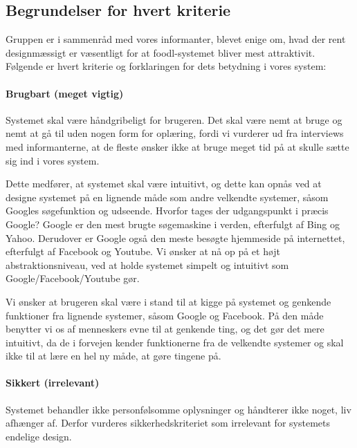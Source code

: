 \subsection{Begrundelser for hvert kriterie}
\label{sec:begrundelsekriterier}
Gruppen er i sammenråd med vores informanter, blevet enige om, hvad der rent designmæssigt er væsentligt for at foodl-systemet bliver mest attraktivit. Følgende er hvert kriterie og forklaringen for dets betydning i vores system:

\paragraph{Brugbart (meget vigtig)} 
Systemet skal være håndgribeligt for brugeren. Det skal være nemt at bruge og nemt at gå til uden nogen form for oplæring, fordi vi vurderer ud fra interviews med informanterne, at de fleste ønsker ikke at bruge meget tid på at skulle sætte sig ind i vores system. 

Dette medfører, at systemet skal være intuitivt, og dette kan opnås ved at designe systemet på en lignende måde som andre velkendte systemer, såsom Googles søgefunktion og udseende. Hvorfor tages der udgangspunkt i præcis Google? Google er den mest brugte søgemaskine i verden, efterfulgt af Bing og Yahoo.\cite{googlesoeg} \cite{ebizmba} Derudover er Google også den meste besøgte hjemmeside på internettet, efterfulgt af Facebook og Youtube. \cite{alexadk} Vi ønsker at nå op på et højt abstraktionsniveau, ved at holde systemet simpelt og intuitivt som Google/Facebook/Youtube gør.

Vi ønsker at brugeren skal være i stand til at kigge på systemet og genkende funktioner fra lignende systemer, såsom Google og Facebook. På den måde benytter vi os af menneskers evne til at genkende ting, og det gør det mere intuitivt, da de i forvejen kender funktionerne fra de velkendte systemer og skal ikke til at lære en hel ny måde, at gøre tingene på.

\paragraph{Sikkert (irrelevant)} 
Systemet behandler ikke personfølsomme oplysninger og håndterer ikke noget, liv afhænger af. Derfor vurderes sikkerhedskriteriet som irrelevant for systemets endelige design.

